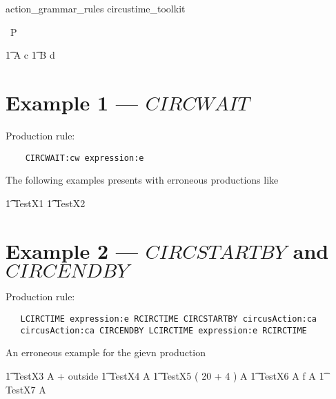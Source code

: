 
\begin{zsection}
   \SECTION action_grammar_rules \parents circustime\_toolkit
\end{zsection}


\begin{circus}
    \circprocess\ P \circdef \circbegin \\
\end{circus}

\begin{circusaction}
    	\t1 A \circdef c \then \Skip
	\also
        \t1 B \circdef d \then \Skip 
\end{circusaction}

\section{Example 1 --- $CIRCWAIT$}

Production rule: 
\begin{verbatim}
	CIRCWAIT:cw expression:e
\end{verbatim}
%
The following examples presents with erroneous productions like

\begin{circusaction}
	\t1 TestX1 \circdef {} \then \Skip
	\also
	\t1 TestX2 \circdef \circwait {} \rcirctime 
\end{circusaction}


\section{Example 2 --- $CIRCSTARTBY$ and $CIRCENDBY$}

Production rule:
\begin{verbatim}
   LCIRCTIME expression:e RCIRCTIME CIRCSTARTBY circusAction:ca
   circusAction:ca CIRCENDBY LCIRCTIME expression:e RCIRCTIME
\end{verbatim}

An erroneous example for the gievn production 
\begin{circusaction}
	\t1 TestX3 \circdef A  + outside \rcirctime \circstartby \Skip 
	\also
	\t1 TestX4  \circstartby A 
	\also
	\t1 TestX5 \circdef  ( 20 + 4 )  \circstartby A 
	\also
	\t1 TestX6 \circdef A \circendby \lcirctime f \rcirctime \then A
	\also
        \t1 TestX7 \circdef A 
\end{circusaction}


